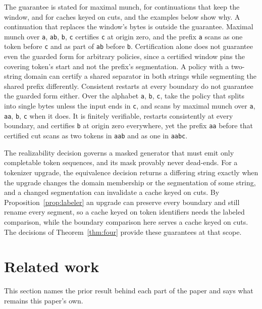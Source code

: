 \documentclass[11pt,a4paper]{article}
\theoremstyle{definition}
\theoremstyle{plain}
\newcommand{\code}[1]{\texttt{#1}}
\begin{document}
The guarantee is stated for maximal munch, for continuations that keep the window, and for caches keyed on cuts, and the
examples below show why. A continuation that replaces the window's bytes is outside the guarantee. Maximal munch over
\code{a}, \code{ab}, \code{b}, \code{c} certifies \code{c} at origin zero, and the prefix \code{a} scans as one token
before \code{c} and as part of \code{ab} before \code{b}. Certification alone does not guarantee even the guarded form
for arbitrary policies, since a certified window pins the covering token's start and not the prefix's segmentation. A
policy with a two-string domain can certify a shared separator in both strings while segmenting the shared prefix
differently. Consistent restarts at every boundary do not guarantee the guarded form either. Over the alphabet \code{a},
\code{b}, \code{c}, take the policy that splits into single bytes unless the input ends in \code{c}, and scans by
maximal munch over \code{a}, \code{aa}, \code{b}, \code{c} when it does. It is finitely verifiable, restarts
consistently at every boundary, and certifies \code{b} at origin zero everywhere, yet the prefix \code{aa} before that
certified cut scans as two tokens in \code{aab} and as one in \code{aabc}.

The realizability decision governs a masked generator that must emit only completable token sequences, and its mask
provably never dead-ends. For a tokenizer upgrade, the equivalence decision returns a differing string exactly when the
upgrade changes the domain membership or the segmentation of some string, and a changed segmentation can invalidate a
cache keyed on cuts. By Proposition~\ref{prop:labeler} an upgrade can preserve every boundary and still rename every
segment, so a cache keyed on token identifiers needs the labeled comparison, while the boundary comparison here serves a
cache keyed on cuts. The decisions of Theorem~\ref{thm:four} provide these guarantees at that scope.

\section{Related work}\label{sec:related}

This section names the prior result behind each part of the paper and says what remains this paper's own.
\end{document}
